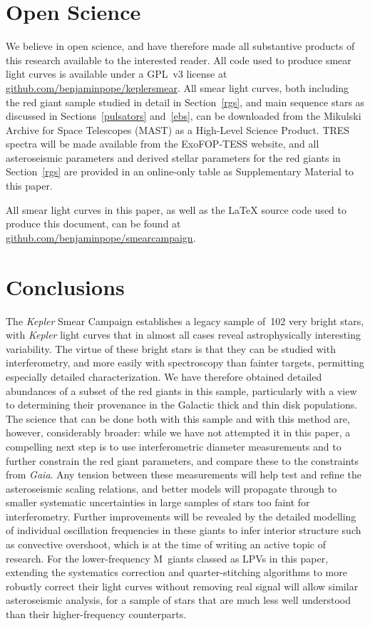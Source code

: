 \documentclass[a4paper,fleqn,usenatbib]{mnras}
\newcommand{\kepler}{\emph{Kepler}\xspace}
\newcommand{\gaia}{\emph{Gaia}\xspace}
\begin{document}
\section{Open Science}
\label{open}

We believe in open science, and have therefore made all substantive products of this research available to the interested reader. All code used to produce smear light curves is available under a GPL~v3 license at \url{github.com/benjaminpope/keplersmear}. All smear light curves, both including the red giant sample studied in detail in Section~\ref{rgs}, and main sequence stars as discussed in Sections~\ref{pulsators} and~\ref{ebs}, can be downloaded from the Mikulski Archive for Space Telescopes (MAST) as a High-Level Science Product. TRES spectra will be made available from the ExoFOP-TESS website, and all asteroseismic parameters and derived stellar parameters for the red giants in Section~\ref{rgs} are provided in an online-only table as Supplementary Material to this paper.

All smear light curves in this paper, as well as the \LaTeX{} source code used to produce this document, can be found
at \url{github.com/benjaminpope/smearcampaign}.


\section{Conclusions}
\label{conclusions}

The \kepler Smear Campaign establishes a legacy sample of~102 very bright stars, with \kepler light curves that in almost all cases reveal astrophysically interesting variability. The virtue of these bright stars is that they can be studied with interferometry, and more easily with spectroscopy than fainter targets, permitting especially detailed characterization. We have therefore obtained detailed abundances of a subset of the red giants in this sample, particularly with a view to determining their provenance in the Galactic thick and thin disk populations. The science that can be done both with this sample and with this method are, however, considerably broader: while we have not attempted it in this paper, a compelling next step is to use interferometric diameter measurements and to further constrain the red giant parameters, and compare these to the constraints from \gaia. Any tension between these measurements will help test and refine the asteroseismic scaling relations, and better models will propagate through to smaller systematic uncertainties in large samples of stars too faint for interferometry. Further improvements will be revealed by the detailed modelling of individual oscillation frequencies in these giants to infer interior structure such as convective overshoot, which is at the time of writing an active topic of research. For the lower-frequency M~giants classed as LPVs in this paper, extending the systematics correction and quarter-stitching algorithms to more robustly correct their light curves without removing real signal will allow similar asteroseismic analysis, for a sample of stars that are much less well understood than their higher-frequency counterparts. 
\end{document}
